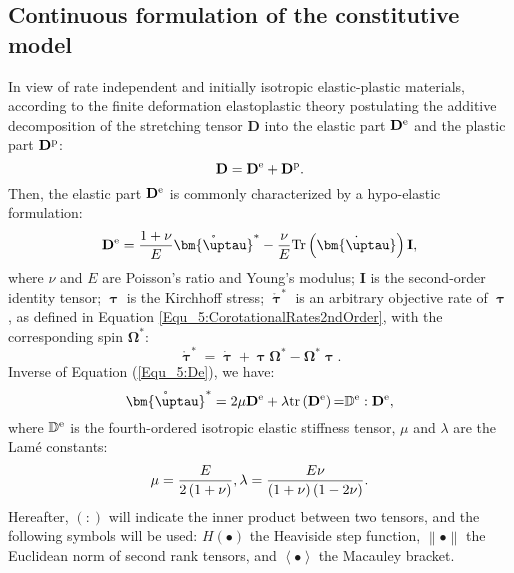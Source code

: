 \subsection{Continuous formulation of the constitutive model}
\noindent
In view of rate independent and initially isotropic elastic-plastic materials, according to the finite deformation elastoplastic theory postulating the additive decomposition of the stretching tensor ${\mathbf{D}}$ into the elastic part ${{\mathbf{D}}^{\rm{e}}}$ and the plastic part ${{\mathbf{D}}^{\rm{p}}}$:
\begin{equation}
{\mathbf{D}} = {{\mathbf{D}}^{\rm{e}}} + {{\mathbf{D}}^{\rm{p}}}.
\end{equation}
Then, the elastic part ${{\mathbf{D}}^{\rm{e}}}$ is commonly characterized by a hypo-elastic formulation:
\begin{equation}
\label{Equ_5:De}
{{\mathbf{D}}^{\rm{e}}} = \frac{{1 + \nu }}{E}{\mathring {\bm{\uptau }}^{*}} - \frac{\nu }{E}{\rm{Tr}}\left( {\dot {\bm{\uptau }}} \right){\mathbf{I}},
\end{equation}
where $\nu$ and $E$ are Poisson's ratio and Young's modulus; ${\mathbf{I}}$ is the second-order identity tensor; $\bm{\uptau}$ is the Kirchhoff stress; ${\mathring {\bm{\uptau }}^{*}}$ is an arbitrary objective rate of $\bm{\uptau}$, as defined in Equation \ref{Equ_5:CorotationalRates2ndOrder}, with the corresponding spin ${{\mathbf{\Omega }}^*}$:
\begin{equation}
{\mathring {\bm{\uptau }}^{*}} = \dot {\bm{\uptau }}  + \bm{\uptau } {{\mathbf{\Omega }}^*} - {{\mathbf{\Omega }}^*}\bm{\uptau }.
\end{equation}
Inverse of Equation (\ref{Equ_5:De}), we have:
\begin{equation}
{\mathring {\bm{\uptau }}^{*}} = 2\mu {{\mathbf{D}}^{\rm{e}}} + \lambda {\rm{tr}}\left( {{{\mathbf{D}}^{\rm{e}}}} \right){\rm{ = }}{\mathbb{D}^{\rm{e}}}:{{\mathbf{D}}^{\rm{e}}},
\end{equation}
where ${\mathbb{D}}^{\rm{e}}$ is the fourth-ordered isotropic elastic stiffness tensor, $\mu$ and $\lambda$ are the Lam\'{e} constants:
\begin{equation}
\mu  = \frac{E}{{2\left( {1 + \nu } \right)}},{\rm{  }}\lambda  = \frac{{E\nu }}{{\left( {1 + \nu } \right)\left( {1 - 2\nu } \right)}}.
\end{equation}
Hereafter, $\left(:\right)$ will indicate the inner product between two tensors, and the following symbols will be used: $H\left(\bullet\right)$ the Heaviside step function, $\left\|\bullet\right\|$ the Euclidean norm of second rank tensors, and $\left<\bullet\right>$ the Macauley bracket.\\
